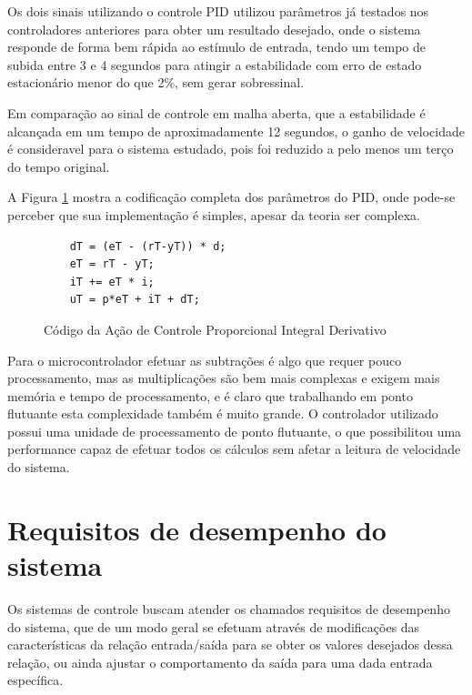 Os dois sinais utilizando o controle PID utilizou parâmetros já testados nos controladores anteriores para obter um resultado desejado, onde o sistema responde de forma bem rápida ao estímulo de entrada, tendo um tempo de subida entre 3 e 4 segundos para atingir a estabilidade com erro de estado estacionário menor do que 2\%, sem gerar sobressinal.


Em comparação ao sinal de controle em malha aberta, que a estabilidade é alcançada em um tempo de aproximadamente 12 segundos, o ganho de velocidade é consideravel para o sistema estudado, pois foi reduzido a pelo menos um terço do tempo original.

A Figura \ref{fig:codigoControladorPID} mostra a codificação completa dos parâmetros do PID, onde pode-se perceber que sua implementação é simples, apesar da teoria ser complexa. 

\begin{figure}[!htb]
\centering
\begin{minipage}{0.8\linewidth}
\lstset{firstnumber=13}
\begin{lstlisting}
    dT = (eT - (rT-yT)) * d;
    eT = rT - yT;
    iT += eT * i; 
    uT = p*eT + iT + dT;
\end{lstlisting}
\end{minipage}
\caption{Código da Ação de Controle Proporcional Integral Derivativo}
\label{fig:codigoControladorPID}
\end{figure}


Para o microcontrolador efetuar as subtrações é algo que requer pouco processamento, mas as multiplicações são bem mais complexas e exigem mais memória e tempo de processamento, e é claro que trabalhando em ponto flutuante esta complexidade também é muito grande. O controlador utilizado possui uma unidade de processamento de ponto flutuante, o que possibilitou uma performance capaz de efetuar todos os cálculos sem afetar a leitura de velocidade do sistema.


\section{Requisitos de desempenho do sistema}

Os sistemas de controle buscam atender os chamados requisitos de desempenho do sistema, que de um modo geral se efetuam através de modificações das características da relação entrada/saída para se obter os valores desejados dessa relação, ou ainda ajustar o comportamento da saída para uma dada entrada específica.

